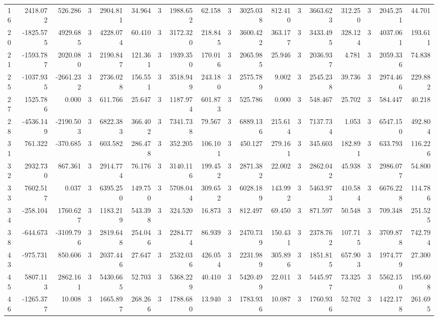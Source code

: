 \begin{table}[ht]
\begin{tabular}{lrrrrrrrrrrrrrrrrr}
16 & 2418.072 & 526.286 & 3 & 2904.811 & 34.964 & 3 & 1988.652 & 62.158 & 3 & 3025.038 & 812.410 & 3 & 3663.623 & 312.250 & 3 & 2045.251 & 44.701 \\
20 & -1825.575 & 4929.685 & 3 & 4228.074 & 60.410 & 3 & 3172.320 & 218.845 & 3 & 3600.422 & 363.177 & 3 & 3433.495 & 328.124 & 3 & 4037.061 & 193.611 \\
21 & -1593.787 & 2020.080 & 3 & 2190.847 & 121.361 & 3 & 1939.350 & 170.016 & 3 & 2065.985 & 25.946 & 3 & 2036.937 & 4.781 & 3 & 2059.336 & 74.838 \\
25 & -1037.935 & -2661.232 & 3 & 2736.028 & 156.551 & 3 & 3518.949 & 243.180 & 3 & 2575.789 & 9.002 & 3 & 2545.238 & 39.736 & 3 & 2974.466 & 229.882 \\
27 & 1525.786 & 0.000 & 3 & 611.766 & 25.647 & 3 & 1187.974 & 601.873 & 3 & 525.786 & 0.000 & 3 & 548.467 & 25.702 & 3 & 584.447 & 40.218 \\
28 & -4536.149 & -2190.503 & 3 & 6822.383 & 366.402 & 3 & 7341.738 & 79.567 & 3 & 6889.136 & 215.614 & 3 & 7137.734 & 1.053 & 3 & 6547.150 & 492.804 \\
31 & 761.322 & -370.685 & 3 & 603.582 & 286.478 & 3 & 352.205 & 106.101 & 3 & 450.127 & 279.161 & 3 & 345.603 & 182.891 & 3 & 633.793 & 116.226 \\
32 & 2932.730 & 867.361 & 3 & 2914.774 & 76.176 & 3 & 3140.116 & 199.452 & 3 & 2871.382 & 22.002 & 3 & 2862.042 & 45.938 & 3 & 2986.077 & 54.800 \\
33 & 7602.517 & 0.037 & 3 & 6395.250 & 149.750 & 3 & 5708.044 & 309.652 & 3 & 6028.189 & 143.992 & 3 & 5463.973 & 410.584 & 3 & 6676.228 & 114.786 \\
34 & -258.104 & 1760.627 & 3 & 1183.219 & 543.398 & 3 & 324.520 & 16.873 & 3 & 812.497 & 69.450 & 3 & 871.597 & 50.548 & 3 & 709.348 & 251.525 \\
38 & -644.673 & -3109.796 & 3 & 2819.648 & 254.046 & 3 & 2284.774 & 86.939 & 3 & 2470.739 & 150.431 & 3 & 2378.762 & 107.715 & 3 & 3709.878 & 742.794 \\
43 & -975.731 & 850.606 & 3 & 2037.446 & 27.647 & 3 & 2532.036 & 426.054 & 3 & 2231.989 & 305.896 & 3 & 1851.815 & 657.903 & 3 & 1974.779 & 27.300 \\
45 & 5807.113 & 2862.161 & 3 & 5430.665 & 52.703 & 3 & 5368.229 & 40.410 & 3 & 5420.499 & 22.011 & 3 & 5445.977 & 73.325 & 3 & 5562.150 & 195.608 \\
46 & -1265.377 & 10.008 & 3 & 1665.897 & 268.266 & 3 & 1788.680 & 13.940 & 3 & 1783.936 & 10.087 & 3 & 1760.936 & 52.702 & 3 & 1422.178 & 261.695 \\

\end{tabular}
\end{table}
